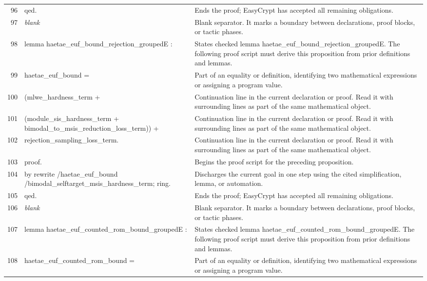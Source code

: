\documentclass[10pt]{article}
\begin{document}
\begin{longtable}{r L{0.53\textwidth} L{0.37\textwidth}}
96 & {\ttfamily\scriptsize qed.} & Ends the proof; EasyCrypt has accepted all remaining obligations. \\
97 & {\ttfamily\scriptsize \emph{blank}} & Blank separator.  It marks a boundary between declarations, proof blocks, or tactic phases. \\
98 & {\ttfamily\scriptsize lemma haetae\_euf\_bound\_rejection\_groupedE :} & States checked lemma haetae\_euf\_bound\_rejection\_groupedE.  The following proof script must derive this proposition from prior definitions and lemmas. \\
99 & {\ttfamily\scriptsize   haetae\_euf\_bound =} & Part of an equality or definition, identifying two mathematical expressions or assigning a program value. \\
100 & {\ttfamily\scriptsize     (mlwe\_hardness\_term +} & Continuation line in the current declaration or proof.  Read it with surrounding lines as part of the same mathematical object. \\
101 & {\ttfamily\scriptsize       (module\_sis\_hardness\_term + bimodal\_to\_msis\_reduction\_loss\_term)) +} & Continuation line in the current declaration or proof.  Read it with surrounding lines as part of the same mathematical object. \\
102 & {\ttfamily\scriptsize     rejection\_sampling\_loss\_term.} & Continuation line in the current declaration or proof.  Read it with surrounding lines as part of the same mathematical object. \\
103 & {\ttfamily\scriptsize proof.} & Begins the proof script for the preceding proposition. \\
104 & {\ttfamily\scriptsize by rewrite /haetae\_euf\_bound /bimodal\_selftarget\_msis\_hardness\_term; ring.} & Discharges the current goal in one step using the cited simplification, lemma, or automation. \\
105 & {\ttfamily\scriptsize qed.} & Ends the proof; EasyCrypt has accepted all remaining obligations. \\
106 & {\ttfamily\scriptsize \emph{blank}} & Blank separator.  It marks a boundary between declarations, proof blocks, or tactic phases. \\
107 & {\ttfamily\scriptsize lemma haetae\_euf\_counted\_rom\_bound\_groupedE :} & States checked lemma haetae\_euf\_counted\_rom\_bound\_groupedE.  The following proof script must derive this proposition from prior definitions and lemmas. \\
108 & {\ttfamily\scriptsize   haetae\_euf\_counted\_rom\_bound =} & Part of an equality or definition, identifying two mathematical expressions or assigning a program value. \\

\end{longtable}
\end{document}
